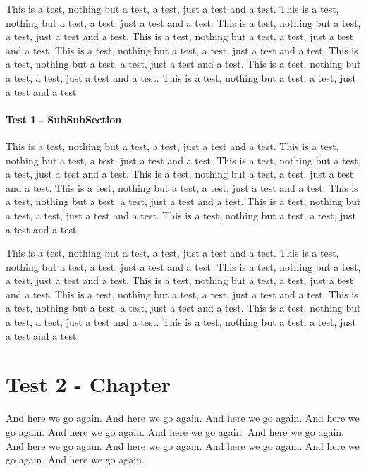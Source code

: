 \documentclass[12pt,twoside]{report}
\begin{document}
This is a test, nothing but a test, a test, just a test and a test.
This is a test, nothing but a test, a test, just a test and a test.
This is a test, nothing but a test, a test, just a test and a test.
This is a test, nothing but a test, a test, just a test and a test.
This is a test, nothing but a test, a test, just a test and a test.
This is a test, nothing but a test, a test, just a test and a test.
This is a test, nothing but a test, a test, just a test and a test.
This is a test, nothing but a test, a test, just a test and a test.

\subsubsection{Test 1 - SubSubSection}

This is a test, nothing but a test, a test, just a test and a test.
This is a test, nothing but a test, a test, just a test and a test.
This is a test, nothing but a test, a test, just a test and a test.
This is a test, nothing but a test, a test, just a test and a test.
This is a test, nothing but a test, a test, just a test and a test.
This is a test, nothing but a test, a test, just a test and a test.
This is a test, nothing but a test, a test, just a test and a test.
This is a test, nothing but a test, a test, just a test and a test.

This is a test, nothing but a test, a test, just a test and a test.
This is a test, nothing but a test, a test, just a test and a test.
This is a test, nothing but a test, a test, just a test and a test.
This is a test, nothing but a test, a test, just a test and a test.
This is a test, nothing but a test, a test, just a test and a test.
This is a test, nothing but a test, a test, just a test and a test.
This is a test, nothing but a test, a test, just a test and a test.
This is a test, nothing but a test, a test, just a test and a test.

%
%
%
\chapter{Test 2 - Chapter}

And here we go again.  And here we go again.  And here we go again.  And
here we go again.  And here we go again.  And here we go again.  And
here we go again.  And here we go again.  And here we go again.  And
here we go again.  And here we go again.  And here we go again.
\end{document}
